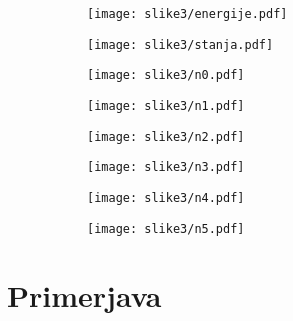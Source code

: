 \documentclass{article}
\begin{document}
\begin{figure}[H]
\begin{subfigure}{.5\textwidth}
\texttt{[image: slike3/energije.pdf]}
\end{subfigure}
\begin{subfigure}{.5\textwidth}
\texttt{[image: slike3/stanja.pdf]}
\end{subfigure}
\end{figure}
\begin{figure}[H]
\begin{subfigure}{.5\textwidth}
\texttt{[image: slike3/n0.pdf]}
\end{subfigure}
\begin{subfigure}{.5\textwidth}
\texttt{[image: slike3/n1.pdf]}
\end{subfigure}
\end{figure}
\begin{figure}[H]
\begin{subfigure}{.5\textwidth}
\texttt{[image: slike3/n2.pdf]}
\end{subfigure}
\begin{subfigure}{.5\textwidth}
\texttt{[image: slike3/n3.pdf]}
\end{subfigure}
\end{figure}
\begin{figure}[H]
\begin{subfigure}{.5\textwidth}
\texttt{[image: slike3/n4.pdf]}
\end{subfigure}
\begin{subfigure}{.5\textwidth}
\texttt{[image: slike3/n5.pdf]}
\end{subfigure}
\end{figure}

\section{Primerjava}
\end{document}
